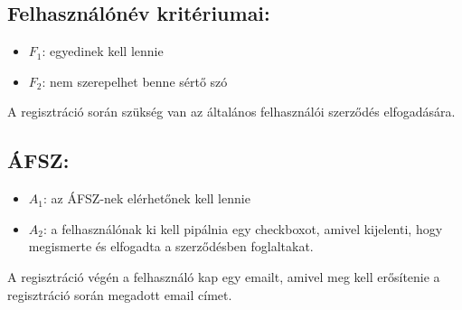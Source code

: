 \subsection{Felhasználónév kritériumai:}

\begin{itemize}
    \item $F_1$: egyedinek kell lennie
    \item $F_2$: nem szerepelhet benne sértő szó
\end{itemize}

A regisztráció során szükség van az általános felhasználói szerződés elfogadására.

\subsection{ÁFSZ:}

\begin{itemize}
    \item $A_1$: az ÁFSZ-nek elérhetőnek kell lennie
    \item $A_2$: a felhasználónak ki kell pipálnia egy checkboxot, amivel kijelenti, hogy megismerte és elfogadta a szerződésben foglaltakat.
\end{itemize}

A regisztráció végén a felhasználó kap egy emailt, amivel meg kell erősítenie a regisztráció során megadott email címet.

